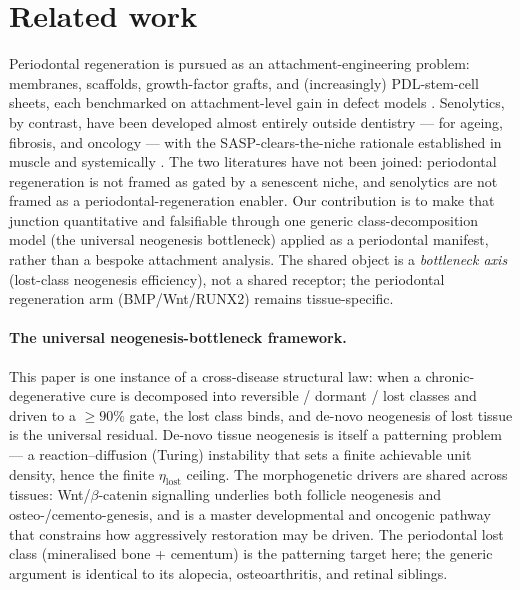 \documentclass[11pt,a4paper]{article}
\begin{document}
\section{Related work}
\label{sec:related}
Periodontal regeneration is pursued as an attachment-engineering problem: membranes,
scaffolds, growth-factor grafts, and (increasingly) PDL-stem-cell sheets, each
benchmarked on attachment-level gain in defect models \citep{kao2015}. Senolytics,
by contrast, have been developed almost entirely outside dentistry --- for ageing,
fibrosis, and oncology --- with the SASP-clears-the-niche rationale established in
muscle \citep{moiseeva2023} and systemically \citep{baker2016}. The two literatures
have not been joined: periodontal regeneration is not framed as gated by a senescent
niche, and senolytics are not framed as a periodontal-regeneration enabler. Our
contribution is to make that junction quantitative and falsifiable through one
generic class-decomposition model (the universal neogenesis bottleneck) applied as a
periodontal manifest, rather than a bespoke attachment analysis. The shared object is
a \emph{bottleneck axis} (lost-class neogenesis efficiency), not a shared receptor;
the periodontal regeneration arm (BMP/Wnt/RUNX2) remains tissue-specific.

\paragraph{The universal neogenesis-bottleneck framework.} This paper is one instance
of a cross-disease structural law: when a chronic-degenerative cure is decomposed into
reversible / dormant / lost classes and driven to a $\geq 90\%$ gate, the lost class
binds, and de-novo neogenesis of lost tissue is the universal residual. De-novo tissue
neogenesis is itself a patterning problem --- a reaction--diffusion (Turing) instability
\citep{turing1952} that sets a finite achievable unit density, hence the finite
$\eta_{\text{lost}}$ ceiling. The morphogenetic drivers are shared across tissues:
Wnt/$\beta$-catenin signalling underlies both follicle neogenesis \citep{ito2007} and
osteo-/cemento-genesis, and is a master developmental and oncogenic pathway
\citep{clevers2012} that constrains how aggressively restoration may be driven. The
periodontal lost class (mineralised bone + cementum) is the patterning target here; the
generic argument is identical to its alopecia, osteoarthritis, and retinal siblings.
\end{document}
